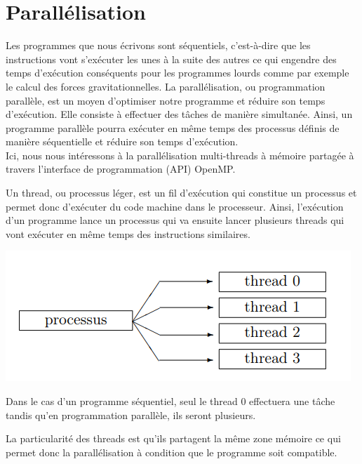 \chapter{Parallélisation }
Les programmes que nous écrivons sont séquentiels, c'est-à-dire que les instructions vont s'exécuter les unes à la suite des autres ce qui engendre des temps d'exécution conséquents pour les programmes lourds comme par exemple le calcul des forces gravitationnelles.
La parallélisation, ou programmation parallèle, est un moyen d'optimiser notre programme et réduire son temps d'exécution. 
Elle consiste à effectuer des tâches de manière simultanée. Ainsi, un programme parallèle pourra exécuter en même temps des processus définis de manière séquentielle et réduire son temps d'exécution.\\

Ici, nous nous intéressons à la parallélisation multi-threads à mémoire partagée à travers l'interface de programmation (API) OpenMP.

\vspace{2mm}
Un thread, ou processus léger, est un fil d'exécution qui constitue un processus et permet donc d'exécuter du code machine dans le processeur. Ainsi, l'exécution d'un programme lance un processus qui va ensuite lancer plusieurs threads qui vont exécuter en même temps des instructions similaires.


\begin{center}
\includegraphics[scale=0.8]{images/process_thread.png}
\captionsetup{hypcap=false}
\label{fig10}

\end{center} 

Dans le cas d'un programme séquentiel, seul le thread 0 effectuera une tâche tandis qu'en programmation parallèle, ils seront plusieurs.

\vspace{2mm}
La particularité des threads est qu'ils partagent la même zone mémoire ce qui permet donc la parallélisation à condition que le programme soit compatible.

